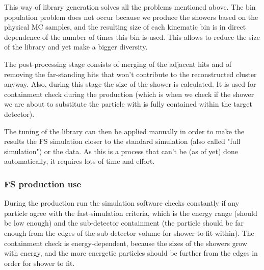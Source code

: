 \begin{figure}
\end{figure}

This way of library generation solves all the problems mentioned above. The bin population problem does not occur because we produce the showers based on the physical MC samples, and the resulting size of each kinematic bin is in direct dependence of the number of times this bin is used. This allows to reduce the size of the library and yet make a bigger diversity.

The post-processing stage consists of merging of the adjacent hits and of removing the far-standing hits that won't contribute to the reconstructed cluster anyway. Also, during this stage the size of the shower is calculated. It is used for containment check during the production (which is when we check if the shower we are about to substitute the particle with is fully contained within the target detector).

The tuning of the library can then be applied manually in order to make the results the FS simulation closer to the standard simulation (also called "full simulation") or the data. As this is a process that can't be (as of yet) done automatically, it requires lots of time and effort.

\subsubsection{FS production use}
\label{sec:MC_FS_prod}

During the production run the simulation software checks constantly if any particle agree with the fast-simulation criteria, which is the energy range (should be low enough) and the sub-detector containment (the particle should be far enough from the edges of the sub-detector volume for shower to fit within). The containment check is energy-dependent, because the sizes of the showers grow with energy, and the more energetic particles should be further from the edges in order for shower to fit.

